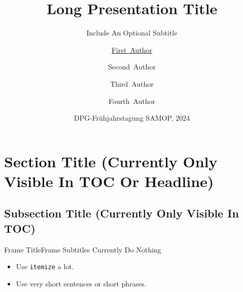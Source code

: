 \documentclass[aspectratio=1610]{beamer}
\title[Short Title]%
{Long Presentation Title}
\subtitle
{Include An Optional Subtitle}
\author[F.~Author] %
{\underline{First~Author}\inst{1} \and Second~Author\inst{1} \and Third~Author\inst{2} \and Fourth~Author\inst{2}}
\institute[Uni Kassel] %
{
  \inst{1}%
  Institute of Physics and CINSaT\\
  University of Kassel
  \and
  \inst{2}%
  Department of Something\\
  University of Somewhere}
\date[DPG 2024] %
{DPG-Frühjahrstagung SAMOP, 2024}
\begin{document}
\begin{frame}
  \titlepage
\end{frame}






\section{Section Title (Currently Only Visible In TOC Or Headline)}

\subsection{Subsection Title (Currently Only Visible In TOC)}

\begin{frame}{Frame Title}{Frame Subtitles Currently Do Nothing}
  \begin{itemize}
    \item Use \texttt{itemize} a lot.
    \item Use very short sentences or short phrases.
  \end{itemize}
\end{frame}
\end{document}
